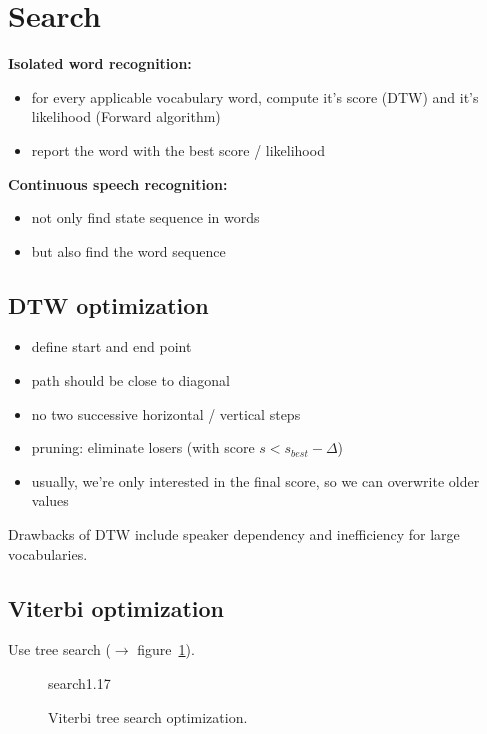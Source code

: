 \documentclass[11pt]{article}
\begin{document}
\section{Search}

\textbf{Isolated word recognition:}
\begin{itemize}
    \item for every applicable vocabulary word, compute it's score (DTW) and it's likelihood (Forward algorithm)
    \item report the word with the best score / likelihood
\end{itemize}

\vspace{5pt}

\textbf{Continuous speech recognition:}
\begin{itemize}
    \item not only find state sequence in words
    \item but also find the word sequence
\end{itemize}

\vspace{5pt}

\subsection{DTW optimization}
\begin{itemize}
    \item define start and end point
    \item path should be close to diagonal
    \item no two successive horizontal / vertical steps
    \item pruning: eliminate losers (with score $s < s_{best} - \Delta$)
    \item usually, we're only interested in the final score, so we can overwrite older values
\end{itemize}

Drawbacks of DTW include speaker dependency and inefficiency for large vocabularies.

\subsection{Viterbi optimization}
Use tree search ($\to$ figure~\ref{fig:viterbiTreeSearchOptimization}).
\begin{figure}[htb]
    \begin{minipage}{\linewidth}
        \vspace{5cm}
        \hfill \scriptsize search1.17
    \end{minipage}
    \caption{\label{fig:viterbiTreeSearchOptimization} Viterbi tree search optimization.}
\end{figure}
\end{document}
